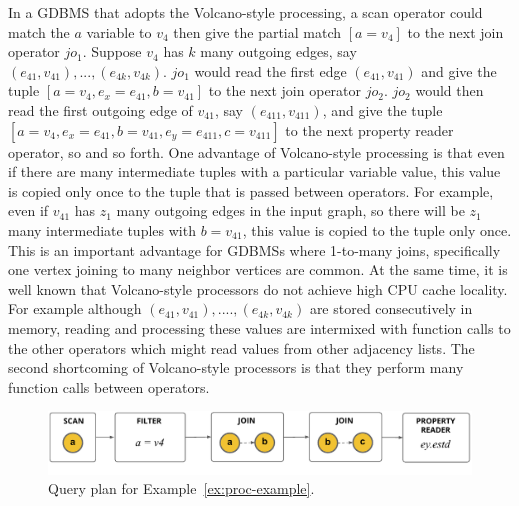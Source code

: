  In a GDBMS that adopts the Volcano-style processing, a scan operator could match the $a$ variable to $v_4$  then give the partial match $[a=v_4]$ to the next join operator $jo_1$. Suppose $v_4$ has $k$ many outgoing edges, say $(e_{41}, v_{41}), ..., (e_{4k}, v_{4k})$. $jo_1$ would read the first edge $(e_{41}, v_{41})$ and give the tuple $[a=v_4, e_x=e_{41}, b=v_{41}]$ to the next join operator $jo_2$. $jo_2$ would then read the first outgoing edge of $v_{41}$, say $(e_{411}, v_{411})$, and give the tuple  $[a=v_4, e_x=e_{41}, b=v_{41}, e_y=e_{411}, c=v_{411}]$ to the next property reader operator, so and so forth. One advantage of Volcano-style processing is that even if there are many intermediate tuples with a particular variable  value, this value is copied only once to the tuple that is passed between operators. For example, even if $v_{41}$ has $z_1$ many outgoing edges in the input graph, so there will be $z_1$ many intermediate tuples with $b=v_{41}$, this value is copied to the tuple only once. This is an important advantage for GDBMSs where 1-to-many joins, specifically one vertex joining to many neighbor vertices are common.   At the same time, it is well known that Volcano-style processors do not achieve high CPU cache locality. For example although $(e_{41}, v_{41}), ...., (e_{4k}, v_{4k})$ are stored consecutively in memory, reading and processing these values are intermixed with function calls to the other operators which might read values from other adjacency lists. The second shortcoming of Volcano-style processors is that they perform many function calls between operators.

\vspace{-5pt}

\begin{figure}
	\begin{center}
		\includegraphics[scale=0.78]{img/proc-qp}
	\end{center}
		\caption{Query plan for Example~\ref{ex:proc-example}.}
	\label{fig:proc-qp}
\end{figure}

